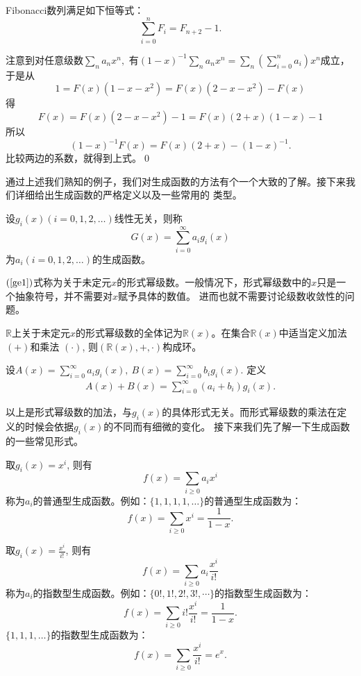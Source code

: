 \begin{prop}
Fibonacci数列满足如下恒等式：
$$\sum_{i=0}^nF_i=F_{n+2}-1.$$
\end{prop}
\pf 注意到对任意级数$\sum_{n}a_nx^n,$ 有$(1-x)^{-1}\sum_{n}a_nx^n=\sum_n(\sum_{i=0}^na_i)x^n$成立，于是从
$$1=F(x)(1-x-x^2)=F(x)(2-x-x^2)-F(x)$$
得
$$F(x)=F(x)(2-x-x^2)-1=F(x)(2+x)(1-x)-1$$
所以
$$(1-x)^{-1}F(x)=F(x)(2+x)-(1-x)^{-1}.$$
比较两边的系数，就得到上式。\qed

通过上述我们熟知的例子，我们对生成函数的方法有个一个大致的了解。接下来我们详细给出生成函数的严格定义以及一些常用的
类型。

\begin{defi}
设$g_i(x)(i=0,1,2,\ldots)$线性无关，则称
\begin{equation}\label{ge1}
G(x)=\sum_{i=0}^{\infty}a_ig_i(x)
\end{equation}
为$a_i(i=0,1,2,\ldots)$的生成函数。
\end{defi}


$(\ref{ge1})$式称为关于未定元$x$的形式幂级数。一般情况下，形式幂级数中的$x$只是一个抽象符号，并不需要对$x$赋予具体的数值。
进而也就不需要讨论级数收敛性的问题。

$\mathbb{R}$上关于未定元$x$的形式幂级数的全体记为$\mathbb{R}(x)$。在集合$\mathbb{R}(x)$中适当定义加法$(+)$和乘法
$(\cdot)$, 则$(\mathbb{R}(x),+,\cdot)$构成环。

设$A(x)=\sum_{i=0}^{\infty}a_ig_i(x),\ B(x)=\sum_{i=0}^{\infty}b_ig_i(x)$. 定义
\begin{eqnarray*}
A(x)+B(x)=\sum_{i=0}^{\infty}(a_i+b_i)g_i(x).
\end{eqnarray*}

以上是形式幂级数的加法，与$g_i(x)$的具体形式无关。而形式幂级数的乘法在定义的时候会依据$g_i(x)$的不同而有细微的变化。
接下来我们先了解一下生成函数的一些常见形式。

\begin{defi}
取$g_i(x)=x^i$, 则有
$$f(x)=\sum_{i\geq0}a_ix^i$$
称为$a_i$的普通型生成函数。例如：$\{1,1,1,1,\ldots\}$的普通型生成函数为：
$$f(x)=\sum_{i\ge0}x^i=\frac{1}{1-x}.$$
\end{defi}

\begin{defi}
取$g_i(x)=\frac{x^i}{i!}$, 则有
$$f(x)=\sum_{i\geq0}a_i\frac{x^i}{i!}$$
称为$a_i$的指数型生成函数。例如：$\{0!,1!,2!,3!,\cdots\}$的指数型生成函数为：
$$f(x)=\sum_{i\ge0}i!\frac{x^i}{i!}=\frac{1}{1-x}.$$
$\{1,1,1,\ldots\}$的指数型生成函数为：
$$f(x)=\sum_{i\ge0}\frac{x^i}{i!}=e^x.$$
\end{defi}


